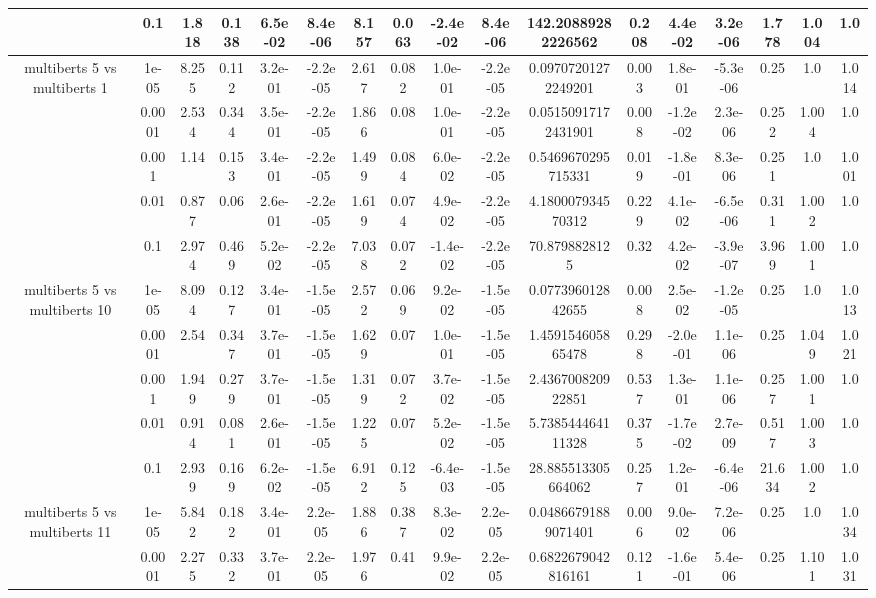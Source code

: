 \begin{tabular}{|c|c|c|c|c|c|c|c|c|c|c|c|c|c|c|c|c|}
 & 0.1 & 1.818 & 0.138 & 6.5e-02 & 8.4e-06 & 8.157 & 0.063 & -2.4e-02 & 8.4e-06 & 142.20889282226562 & 0.208 & 4.4e-02 & 3.2e-06 & 1.778 & 1.004 & 1.0 \\
\hline
\multirow{5}{*}{multiberts 5 vs multiberts 1} & 1e-05 & 8.255 & 0.112 & 3.2e-01 & -2.2e-05 & 2.617 & 0.082 & 1.0e-01 & -2.2e-05 & 0.09707201272249201 & 0.003 & 1.8e-01 & -5.3e-06 & 0.25 & 1.0 & 1.014 \\
 & 0.0001 & 2.534 & 0.344 & 3.5e-01 & -2.2e-05 & 1.866 & 0.08 & 1.0e-01 & -2.2e-05 & 0.05150917172431901 & 0.008 & -1.2e-02 & 2.3e-06 & 0.252 & 1.004 & 1.0 \\
 & 0.001 & 1.14 & 0.153 & 3.4e-01 & -2.2e-05 & 1.499 & 0.084 & 6.0e-02 & -2.2e-05 & 0.5469670295715331 & 0.019 & -1.8e-01 & 8.3e-06 & 0.251 & 1.0 & 1.001 \\
 & 0.01 & 0.877 & 0.06 & 2.6e-01 & -2.2e-05 & 1.619 & 0.074 & 4.9e-02 & -2.2e-05 & 4.180007934570312 & 0.229 & 4.1e-02 & -6.5e-06 & 0.311 & 1.002 & 1.0 \\
 & 0.1 & 2.974 & 0.469 & 5.2e-02 & -2.2e-05 & 7.038 & 0.072 & -1.4e-02 & -2.2e-05 & 70.8798828125 & 0.32 & 4.2e-02 & -3.9e-07 & 3.969 & 1.001 & 1.0 \\
\hline
\multirow{5}{*}{multiberts 5 vs multiberts 10} & 1e-05 & 8.094 & 0.127 & 3.4e-01 & -1.5e-05 & 2.572 & 0.069 & 9.2e-02 & -1.5e-05 & 0.077396012842655 & 0.008 & 2.5e-02 & -1.2e-05 & 0.25 & 1.0 & 1.013 \\
 & 0.0001 & 2.54 & 0.347 & 3.7e-01 & -1.5e-05 & 1.629 & 0.07 & 1.0e-01 & -1.5e-05 & 1.459154605865478 & 0.298 & -2.0e-01 & 1.1e-06 & 0.25 & 1.049 & 1.021 \\
 & 0.001 & 1.949 & 0.279 & 3.7e-01 & -1.5e-05 & 1.319 & 0.072 & 3.7e-02 & -1.5e-05 & 2.436700820922851 & 0.537 & 1.3e-01 & 1.1e-06 & 0.257 & 1.001 & 1.0 \\
 & 0.01 & 0.914 & 0.081 & 2.6e-01 & -1.5e-05 & 1.225 & 0.07 & 5.2e-02 & -1.5e-05 & 5.738544464111328 & 0.375 & -1.7e-02 & 2.7e-09 & 0.517 & 1.003 & 1.0 \\
 & 0.1 & 2.939 & 0.169 & 6.2e-02 & -1.5e-05 & 6.912 & 0.125 & -6.4e-03 & -1.5e-05 & 28.885513305664062 & 0.257 & 1.2e-01 & -6.4e-06 & 21.634 & 1.002 & 1.0 \\
\hline
\multirow{5}{*}{multiberts 5 vs multiberts 11} & 1e-05 & 5.842 & 0.182 & 3.4e-01 & 2.2e-05 & 1.886 & 0.387 & 8.3e-02 & 2.2e-05 & 0.04866791889071401 & 0.006 & 9.0e-02 & 7.2e-06 & 0.25 & 1.0 & 1.034 \\
 & 0.0001 & 2.275 & 0.332 & 3.7e-01 & 2.2e-05 & 1.976 & 0.41 & 9.9e-02 & 2.2e-05 & 0.6822679042816161 & 0.121 & -1.6e-01 & 5.4e-06 & 0.25 & 1.101 & 1.031 \\

\end{tabular}
